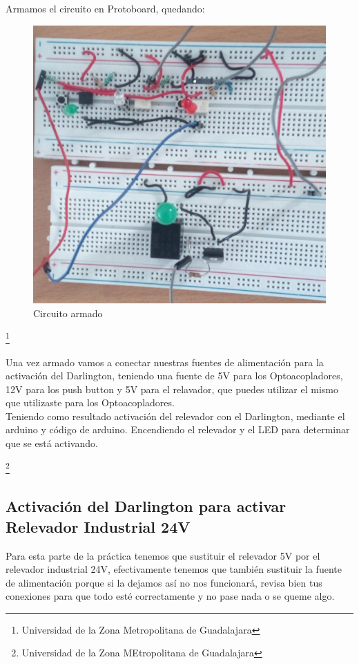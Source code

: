 \documentclass[10pt,a4paper]{article}
\begin{document}
Armamos el circuito en Protoboard, quedando:\\
\begin{figure}[hbtp]
\centering
\includegraphics[scale=0.13]{Pictures/Protoboard.jpeg}
\caption{Circuito armado}
\end{figure}

\footnote{Universidad de la Zona Metropolitana de Guadalajara}

\newpage
Una vez armado vamos a conectar nuestras fuentes de alimentación para la activación del Darlington, teniendo una fuente de 5V para los Optoacopladores, 12V para los push button y 5V para el relavador, que puedes utilizar el mismo que utilizaste para los Optoacopladores.\\
Teniendo como resultado activación del relevador con el Darlington, mediante el arduino y código de arduino. Encendiendo el relevador y el LED para determinar que se está activando. 

\footnote{Universidad de la Zona MEtropolitana de Guadalajara}

\newpage
\subsection{Activación del Darlington para activar Relevador Industrial 24V}
Para esta parte de la práctica tenemos que sustituir el relevador 5V por el relevador industrial 24V, efectivamente tenemos que también sustituir la fuente de alimentación porque si la dejamos así no nos funcionará, revisa bien tus conexiones para que todo esté correctamente y no pase nada o se queme algo.\\
\end{document}
